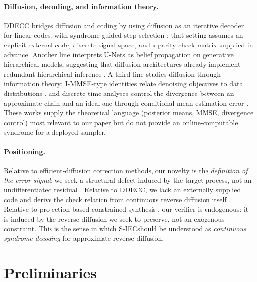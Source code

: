 \documentclass{article}
\theoremstyle{plain}
\theoremstyle{definition}
\theoremstyle{remark}
\newcommand{\SIEC}{\texorpdfstring{S\mbox{-}IEC\xspace}{S-IEC }}
\begin{document}
\paragraph{Diffusion, decoding, and information theory.}
DDECC bridges diffusion and coding by using diffusion as an iterative decoder
for linear codes, with syndrome-guided step selection
\citep{choukroun2023ddecc}; that setting assumes an explicit external code,
discrete signal space, and a parity-check matrix supplied in advance. Another
line interprets U-Nets as belief propagation on generative hierarchical
models, suggesting that diffusion architectures already implement redundant
hierarchical inference \citep{mei2025unetbp}. A third line studies diffusion
through information theory: I-MMSE-type identities relate denoising objectives
to data distributions \citep{guo2005immse,kong2023itdiffusion}, and
discrete-time analyses control the divergence between an approximate chain
and an ideal one through conditional-mean estimation error
\citep{reeves2025itproofs}. These works supply the theoretical language
(posterior means, MMSE, divergence control) most relevant to our paper but do
not provide an online-computable syndrome for a deployed sampler.

\paragraph{Positioning.}
Relative to efficient-diffusion correction methods, our novelty is the
\emph{definition of the error signal}: we seek a structural defect induced by
the target process, not an undifferentiated residual
\citep{yao2024tac,zhong2026iec}. Relative to DDECC, we lack an externally
supplied code and derive the check relation from continuous reverse diffusion
itself \citep{choukroun2023ddecc}. Relative to projection-based constrained
synthesis \citep{christopher2024projected}, our verifier is endogenous: it is
induced by the reverse diffusion we seek to preserve, not an exogenous
constraint. This is the sense in which \SIEC should be understood
as \emph{continuous syndrome decoding} for approximate reverse diffusion.

\section{Preliminaries}
\label{sec:preliminaries}
\end{document}
